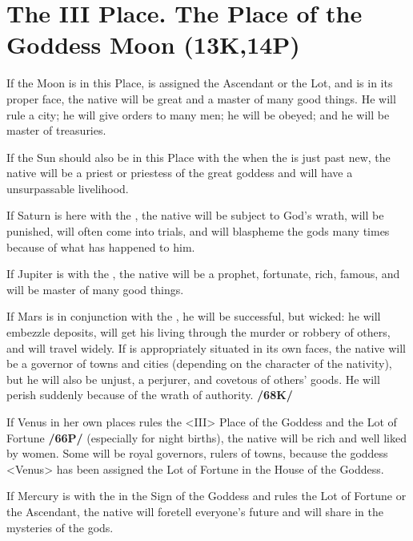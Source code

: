 \section{The III Place. The Place of the Goddess Moon (13K,14P)}
If the Moon is in this Place, is assigned the Ascendant or the Lot, and is in its proper face, the native will be great and a master of many good things. He will rule a city; he will give orders to many men; he will be obeyed; and he will be master of treasuries. 

If the Sun should also be in this Place with the \Moon\xspace when the \Moon\xspace is just past new, the native will be a priest or priestess of the great goddess and will have a unsurpassable livelihood. 

If Saturn is here with the \Moon, the native will be subject to God's wrath, will be punished, will often come into trials, and will blaspheme the gods many times because of what has happened to him. 

If Jupiter is with the \Moon, the native will be a prophet, fortunate, rich, famous, and will be master of many good things. 

If Mars is in conjunction with the \Moon, he will be successful, but wicked: he will embezzle deposits, will get his living through the murder or robbery of others, and will travel widely. If \Mars\xspace is appropriately situated in its own faces, the native will be a governor of towns and cities (depending on the character of the nativity), but he will also be unjust, a perjurer, and covetous of others’ goods. He will perish suddenly because of the wrath of authority. \textbf{/68K/} 

If Venus in her own places rules the <III> Place of the Goddess and the Lot of Fortune \textbf{/66P/} (especially for night births), the native will be rich and well liked by women. Some will be royal governors, rulers of towns, because the goddess <Venus> has been assigned the Lot of Fortune in the House of the Goddess. 

If Mercury is with the \Moon\xspace in the Sign of the Goddess and rules the Lot of Fortune or the Ascendant, the native will foretell everyone’s future and will share in the mysteries of the gods.

\newpage